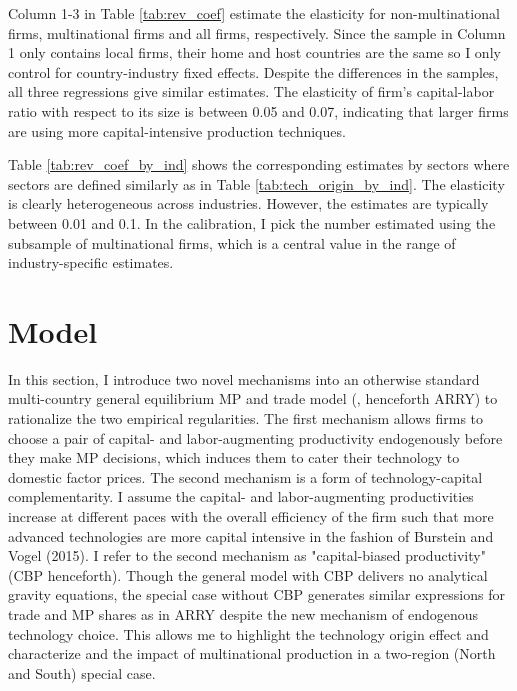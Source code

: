 \documentclass[notitlepage,11pt]{article}%
\begin{document}
Column 1-3 in Table \ref{tab:rev_coef} estimate the elasticity for
non-multinational firms, multinational firms and all firms, respectively.
Since the sample in Column 1 only contains local firms, their home and host
countries are the same so I only control for country-industry fixed effects.
Despite the differences in the samples, all three regressions give similar
estimates. The elasticity of firm's capital-labor ratio with respect to its
size is between 0.05 and 0.07, indicating that larger firms are using more
capital-intensive production techniques.%

%


Table \ref{tab:rev_coef_by_ind} shows the corresponding estimates by sectors
where sectors are defined similarly as in Table \ref{tab:tech_origin_by_ind}.
The elasticity is clearly heterogeneous across industries. However, the
estimates are typically between 0.01 and 0.1. In the calibration, I pick the
number estimated using the subsample of multinational firms, which is a
central value in the range of industry-specific estimates.%

%


\section{Model\label{sec:model}}

In this section, I introduce two novel mechanisms into an otherwise standard
multi-country general equilibrium MP and trade model
(\cite{arkolakis_innovation_2013}, henceforth ARRY) to rationalize the two
empirical regularities. The first mechanism allows firms to choose a pair of
capital- and labor-augmenting productivity endogenously before they make MP
decisions, which induces them to cater their technology to domestic factor
prices. The second mechanism is a form of technology-capital complementarity.
I assume the capital- and labor-augmenting productivities increase at
different paces with the overall efficiency of the firm such that more
advanced technologies are more capital intensive in the fashion of Burstein
and Vogel (2015). I refer to the second mechanism as "capital-biased
productivity" (CBP henceforth). Though the general model with CBP delivers no
analytical gravity equations, the special case without CBP generates similar
expressions for trade and MP shares as in ARRY despite the new mechanism of
endogenous technology choice. This allows me to highlight the technology
origin effect and characterize and the impact of multinational production in a
two-region (North and South) special case.
\end{document}
